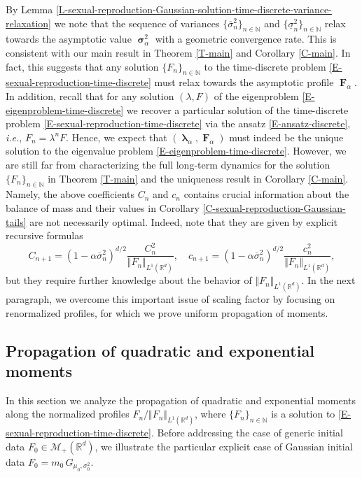 \documentclass[reqno]{amsart}
\DeclareMathOperator{\blambda}{\boldsymbol{\lambda}}
\DeclareMathOperator{\bsigma}{\boldsymbol{\sigma}}
\DeclareMathOperator{\bF}{\boldsymbol{F}}
\numberwithin{equation}{section}
\begin{document}
{By Lemma \ref{L-sexual-reproduction-Gaussian-solution-time-discrete-variance-relaxation} we note that the sequence of variances $\{\overline{\sigma}_n^2\}_{n\in \mathbb{N}}$ and $\{\underline{\sigma}_n^2\}_{n\in \mathbb{N}}$ relax towards the asymptotic value $\bsigma_\alpha^2$ with a geometric convergence rate. This is consistent with our main result in Theorem \ref{T-main} and Corollary \ref{C-main}. In fact, this suggests that any solution $\{F_n\}_{n\in \mathbb{N}}$ to the time-discrete problem \eqref{E-sexual-reproduction-time-discrete} must relax towards the asymptotic profile $\bF_\alpha$. In addition, recall that for any solution $(\lambda,F)$ of the eigenproblem \eqref{E-eigenproblem-time-discrete} we recover a particular solution of the time-discrete problem \eqref{E-sexual-reproduction-time-discrete} via the ansatz \eqref{E-ansatz-discrete}, {\em i.e.}, $F_n=\lambda^n F$. Hence, we expect that $(\blambda_\alpha,\bF_\alpha)$ must indeed be the unique solution to the eigenvalue problem \eqref{E-eigenproblem-time-discrete}. However, we are still far from characterizing the full long-term dynamics for the solution $\{F_n\}_{n\in \mathbb{N}}$ in Theorem \ref{T-main} and the uniqueness result in Corollary \ref{C-main}. Namely, the above coefficients $C_n$ and $c_n$ contains crucial information about the balance of mass and their values in Corollary \ref{C-sexual-reproduction-Gaussian-tails} are not necessarily optimal. Indeed, note that they are given by explicit recursive formulas
$$C_{n+1}=(1-\alpha\overline{\sigma}_n^2)^{d/2}\frac{C_n^2}{\Vert F_n\Vert_{L^1(\mathbb{R}^d)}},\quad c_{n+1}=(1-\alpha\overline{\sigma}_n^2)^{d/2}\frac{c_n^2}{\Vert F_n\Vert_{L^1(\mathbb{R}^d)}},$$
but they require further knowledge about the behavior of $\Vert F_n\Vert_{L^1(\mathbb{R}^d)}$. In the next paragraph, we overcome this important issue of scaling factor by focusing on renormalized profiles, for which we prove uniform propagation of moments.


\subsection{Propagation of quadratic and exponential moments}\label{SS-propagation-moments}

In this section we analyze the propagation of quadratic and exponential moments along the normalized profiles $F_n/\Vert F_n\Vert_{L^1(\mathbb{R}^d)}$, where $\{F_n\}_{n\in \mathbb{N}}$ is a solution to \eqref{E-sexual-reproduction-time-discrete}. Before addressing the case of generic initial data $F_0\in \mathcal{M}_+(\mathbb{R}^d)$, we illustrate the particular explicit case of Gaussian initial data $F_0=m_0\,G_{\mu_0,\sigma_0^2}$.

}
\end{document}

